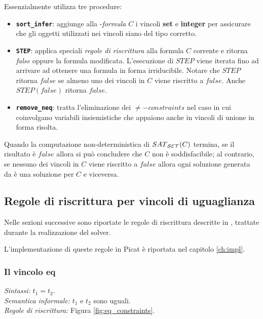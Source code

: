 \documentclass[12pt,a4paper,openright]{book}  %
\begin{document}
Essenzialmente  utilizza tre procedure:

\begin{itemize}
	\item \textbf{\texttt{sort\_infer}}: aggiunge alla
          \calset{}-\textit{formula} $C$ i vincoli \textbf{set} e
          \textbf{integer} per assicurare che gli oggetti utilizzati
          nei vincoli siano del tipo corretto.

	\item \textbf{\texttt{STEP}}: applica speciali \textit{regole
          di riscrittura} alla formula $C$ corrente e ritorna
          \textit{false} oppure la formula modificata. L'esecuzione di
          $STEP$ viene iterata fino ad arrivare ad ottenere una
          formula in forma irriducibile. Notare che $STEP$ ritorna
          $false$ se almeno uno dei vincoli in $C$ viene riscritto a
          $false$. Anche $STEP(false)$ ritorna $false$.

	\item \textbf{\texttt{remove\_neq}}: tratta l'eliminazione dei
          $\neq-constraints$ nel caso in cui coinvolgano variabili
          insiemistiche che appaiono anche in vincoli di unione in
          forma risolta.
\end{itemize}

Quando la computazione non-deterministica di $SAT\textsubscript{\ensuremath{\mathcal{S}}\ensuremath{\mathcal{E}}\ensuremath{\mathcal{T}}}{}(C)$ termina,
se il risultato è $false$ allora si può concludere che $C$ non è
soddisfacibile; al contrario, se nessuno dei vincoli in $C$ viene
riscritto a $false$ allora ogni soluzione generata da \satset{} è una
soluzione per $C$ e viceversa.

\subsection{Regole di riscrittura per vincoli di uguaglianza}
\label{subsec:clpbasedlang_lset_rewriteeq}

Nelle sezioni successive sono riportate le regole di riscrittura
descritte in \cite{Rossi18}, trattate durante la realizzazione del
solver.

L'implementazione di queste regole in Picat è riportata nel capitolo
\ref{ch:impl}.

\subsubsection{Il vincolo eq}

\textit{Sintassi:} $t_1 = t_2$.\\
\noindent\textit{Semantica informale:} $t_1$ e $t_2$ sono uguali.\\
\noindent\textit{Regole di riscrittura:} Figura \ref{fig:eq_constraints}.
\end{document}
